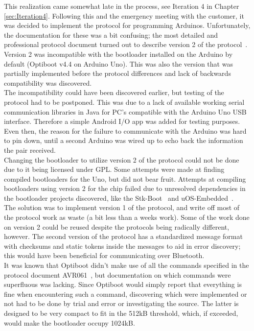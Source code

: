 	This realization came somewhat late in the process, see Iteration 4 in Chapter \ref{sec:Iteration4}. Following this and the emergency meeting with the customer, it was decided to implement the protocol for programming Arduinos. Unfortunately, the documentation for these was a bit confusing; the most detailed and professional protocol document turned out to describe version 2 of the protocol~\cite{AVR068}. Version 2 was incompatible with the bootloader installed on the Arduino by default (Optiboot v4.4 on Arduino Uno). This was also the version that was partially implemented before the protocol differences and lack of backwards compatibility was discovered.\\

	The incompatibility could have been discovered earlier, but testing of the protocol had to be postponed. This was due to a lack of available working serial communication libraries in Java for PC's compatible with the Arduino Uno USB interface. Therefore a simple Android I/O app was added for testing purposes. Even then, the reason for the failure to communicate with the Arduino was hard to pin down, until a second Arduino was wired up to echo back the information the pair received.\\

	Changing the bootloader to utilize version 2 of the protocol could not be done due to it being licensed under GPL. Some attempts were made at finding compiled bootloaders for the Uno, but did not bear fruit. Attempts at compiling bootloaders using version 2 for the chip failed due to unresolved dependencies in the bootloader projects discovered, like the Stk-Boot~\cite{StkBoot} and uOS-Embedded~\cite{uOS-Embedded}.\\

	The solution was to implement version 1 of the protocol, and write off most of the protocol work as waste (a bit less than a weeks work). Some of the work done on version 2 could be reused despite the protocols being radically different, however. The second version of the protocol has a standardized message format with checksums and static tokens inside the messages to aid in error discovery; this would have been beneficial for communicating over Bluetooth.\\

	It was known that Optiboot didn't make use of all the commands specified in the protocol document AVR061~\cite{AVR061}, but documentation on which commands were superfluous was lacking. Since Optiboot would simply report that everything is fine when encountering such a command, discovering which were implemented or not had to be done by trial and error or investigating the source. The latter is designed to be very compact to fit in the 512kB threshold, which, if exceeded, would make the bootloader occupy 1024kB.\\

